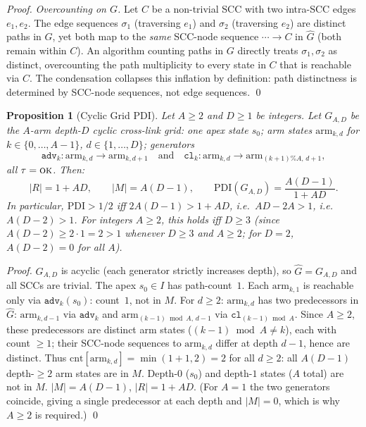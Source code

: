 \documentclass[11pt,letterpaper]{article}
\theoremstyle{plain}
\newtheorem{proposition}[theorem]{Proposition}
\theoremstyle{definition}
\theoremstyle{remark}
\newcommand{\PDI}{\mathrm{PDI}}
\newcommand{\OK}{\textup{\textsc{ok}}}
\newcommand{\Ghat}{\hat{G}}
\begin{document}
\begin{proof}
  \emph{Overcounting on $G$.}
  Let $C$ be a non-trivial SCC with two intra-SCC edges $e_1, e_2$.
  The edge sequences $\sigma_1$ (traversing $e_1$) and $\sigma_2$
  (traversing $e_2$) are distinct paths in $G$, yet both map to the
  \emph{same} SCC-node sequence $\cdots \to C$ in $\Ghat$
  (both remain within $C$).
  An algorithm counting paths in $G$ directly treats $\sigma_1, \sigma_2$
  as distinct, overcounting the path multiplicity to every state in $C$
  that is reachable via $C$.
  The condensation collapses this inflation by definition: path distinctness
  is determined by SCC-node sequences, not edge sequences. \qed
\end{proof}

\begin{proposition}[Cyclic Grid PDI]
  \label{prop:grid_pdi}
  Let $A \geq 2$ and $D \geq 1$ be integers.
  Let $G_{A,D}$ be the \emph{$A$-arm depth-$D$ cyclic cross-link grid}:
  one apex state $s_0$; arm states $\mathrm{arm}_{k,d}$ for $k \in \{0,\ldots,A{-}1\}$,
  $d \in \{1,\ldots,D\}$; generators
  \[
    \texttt{adv}_k: \mathrm{arm}_{k,d} \to \mathrm{arm}_{k,d+1}
    \quad\text{and}\quad
    \texttt{cl}_k: \mathrm{arm}_{k,d} \to \mathrm{arm}_{(k+1)\%A,\,d+1},
  \]
  all $\tau = \OK$.
  Then:
  \[
    |R| = 1 + AD, \qquad |M| = A(D-1), \qquad
    \PDI(G_{A,D}) = \frac{A(D-1)}{1+AD}.
  \]
  In particular, $\PDI > 1/2$ iff $2A(D-1) > 1 + AD$,
  i.e.\ $AD - 2A > 1$, i.e.\ $A(D-2) > 1$.
  For integers $A \geq 2$, this holds iff $D \geq 3$
  (since $A(D-2) \geq 2 \cdot 1 = 2 > 1$ whenever $D \geq 3$ and $A \geq 2$;
  for $D = 2$, $A(D-2) = 0$ for all $A$).
\end{proposition}
\begin{proof}
  $G_{A,D}$ is acyclic (each generator strictly increases depth), so
  $\Ghat = G_{A,D}$ and all SCCs are trivial.
  The apex $s_0 \in I$ has path-count~$1$.
  Each $\mathrm{arm}_{k,1}$ is reachable only via $\texttt{adv}_k(s_0)$:
  count~$1$, not in $M$.
  For $d \geq 2$: $\mathrm{arm}_{k,d}$ has two predecessors in $\Ghat$:
  $\mathrm{arm}_{k,d-1}$ via $\texttt{adv}_k$ and
  $\mathrm{arm}_{(k-1)\bmod A,\,d-1}$ via $\texttt{cl}_{(k-1)\bmod A}$.
  Since $A \geq 2$, these predecessors are distinct arm states
  ($(k-1)\bmod A \neq k$), each with count $\geq 1$;
  their SCC-node sequences to $\mathrm{arm}_{k,d}$ differ at depth $d-1$,
  hence are distinct.
  Thus $\mathrm{cnt}[\mathrm{arm}_{k,d}] = \min(1+1,2) = 2$ for all $d \geq 2$:
  all $A(D-1)$ depth-$\geq 2$ arm states are in $M$.
  Depth-$0$ ($s_0$) and depth-$1$ states ($A$ total) are not in $M$.
  $|M| = A(D-1)$, $|R| = 1 + AD$.
  (For $A = 1$ the two generators coincide, giving a single predecessor at
  each depth and $|M| = 0$, which is why $A \geq 2$ is required.) \qed
\end{proof}
\end{document}
